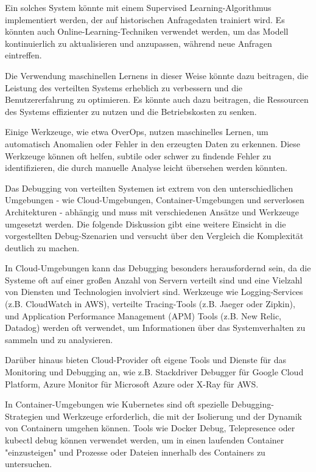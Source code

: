 Ein solches System könnte mit einem Supervised Learning-Algorithmus implementiert werden, der auf historischen Anfragedaten trainiert wird. Es könnten auch Online-Learning-Techniken verwendet werden, um das Modell kontinuierlich zu aktualisieren und anzupassen, während neue Anfragen eintreffen.

Die Verwendung maschinellen Lernens in dieser Weise könnte dazu beitragen, die Leistung des verteilten Systems erheblich zu verbessern und die Benutzererfahrung zu optimieren. Es könnte auch dazu beitragen, die Ressourcen des Systems effizienter zu nutzen und die Betriebskosten zu senken.

Einige Werkzeuge, wie etwa OverOps, nutzen maschinelles Lernen, um automatisch Anomalien oder Fehler in den erzeugten Daten zu erkennen. Diese Werkzeuge können oft helfen, subtile oder schwer zu findende Fehler zu identifizieren, die durch manuelle Analyse leicht übersehen werden könnten.

Das Debugging von verteilten Systemen ist extrem von den unterschiedlichen Umgebungen - wie Cloud-Umgebungen, Container-Umgebungen und serverlosen Architekturen - abhängig und muss mit verschiedenen Ansätze und Werkzeuge umgesetzt werden. Die folgende Diskussion gibt eine weitere Einsicht in die vorgestellten Debug-Szenarien und versucht über den Vergleich die Komplexität deutlich zu machen. 

In Cloud-Umgebungen kann das Debugging besonders herausfordernd sein, da die Systeme oft auf einer großen Anzahl von Servern verteilt sind und eine Vielzahl von Diensten und Technologien involviert sind. Werkzeuge wie Logging-Services (z.B. CloudWatch in AWS), verteilte Tracing-Tools (z.B. Jaeger oder Zipkin), und Application Performance Management (APM) Tools (z.B. New Relic, Datadog) werden oft verwendet, um Informationen über das Systemverhalten zu sammeln und zu analysieren.

Darüber hinaus bieten Cloud-Provider oft eigene Tools und Dienste für das Monitoring und Debugging an, wie z.B. Stackdriver Debugger für Google Cloud Platform, Azure Monitor für Microsoft Azure oder X-Ray für AWS.

In Container-Umgebungen wie Kubernetes sind oft spezielle Debugging-Strategien und Werkzeuge erforderlich, die mit der Isolierung und der Dynamik von Containern umgehen können. Tools wie Docker Debug, Telepresence oder kubectl debug können verwendet werden, um in einen laufenden Container "einzusteigen" und Prozesse oder Dateien innerhalb des Containers zu untersuchen.

